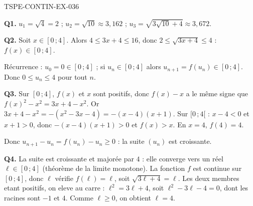 \begin{corrige}{TSPE-CONTIN-EX-036}

\textbf{Q1.} $u_1 = \sqrt{4} = 2$ ; $u_2 = \sqrt{10} \approx 3{,}162$ ; $u_3 = \sqrt{3\sqrt{10}+4} \approx 3{,}672$.

\textbf{Q2.} Soit $x \in [0\,;4]$. Alors $4 \leq 3x+4 \leq 16$, donc $2 \leq \sqrt{3x+4} \leq 4$ : $f(x) \in [0\,;4]$.

Récurrence : $u_0 = 0 \in [0\,;4]$ ; si $u_n \in [0\,;4]$ alors $u_{n+1} = f(u_n) \in [0\,;4]$. Donc $0 \leq u_n \leq 4$ pour tout $n$.

\textbf{Q3.} Sur $[0\,;4]$, $f(x)$ et $x$ sont positifs, donc $f(x) - x$ a le même signe que $f(x)^2 - x^2 = 3x + 4 - x^2$. Or $3x + 4 - x^2 = -(x^2 - 3x - 4) = -(x-4)(x+1)$. Sur $[0\,;4[$ : $x - 4 < 0$ et $x + 1 > 0$, donc $-(x-4)(x+1) > 0$ et $f(x) > x$. En $x = 4$, $f(4) = 4$.

Donc $u_{n+1} - u_n = f(u_n) - u_n \geq 0$ : la suite $(u_n)$ est croissante.

\textbf{Q4.} La suite est croissante et majorée par $4$ : elle converge vers un réel $\ell \in [0\,;4]$ (théorème de la limite monotone). La fonction $f$ est continue sur $[0\,;4]$, donc $\ell$ vérifie $f(\ell) = \ell$, soit $\sqrt{3\ell+4} = \ell$. Les deux membres etant positifs, on eleve au carre : $\ell^2 = 3\ell + 4$, soit $\ell^2 - 3\ell - 4 = 0$, dont les racines sont $-1$ et $4$. Comme $\ell \geq 0$, on obtient $\ell = 4$.
\end{corrige}
